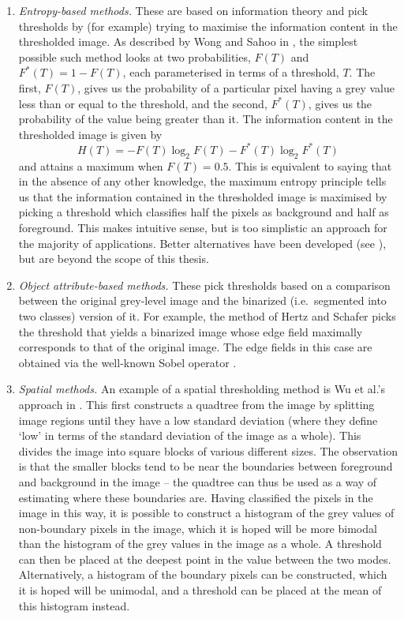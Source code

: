 \begin{enumerate}
\item \emph{Entropy-based methods.} These are based on information theory and pick thresholds by (for example) trying to maximise the information content in the thresholded image. As described by Wong and Sahoo in \cite{wong89}, the simplest possible such method looks at two probabilities, $F(T)$ and $F^*(T) = 1 - F(T)$, each parameterised in terms of a threshold, $T$. The first, $F(T)$, gives us the probability of a particular pixel having a grey value less than or equal to the threshold, and the second, $F^*(T)$, gives us the probability of the value being greater than it. The information content in the thresholded image is given by
%
\[
H(T) = -F(T) \log_2 F(T) - F^*(T) \log_2 F^*(T)
\]
%
and attains a maximum when $F(T) = 0.5$. This is equivalent to saying that in the absence of any other knowledge, the maximum entropy principle tells us that the information contained in the thresholded image is maximised by picking a threshold which classifies half the pixels as background and half as foreground. This makes intuitive sense, but is too simplistic an approach for the majority of applications. Better alternatives have been developed (see \cite{sezgin04}), but are beyond the scope of this thesis.

\item \emph{Object attribute-based methods.} These pick thresholds based on a comparison between the original grey-level image and the binarized (i.e.~segmented into two classes) version of it. For example, the method of Hertz and Schafer \cite{hertz88} picks the threshold that yields a binarized image whose edge field maximally corresponds to that of the original image. The edge fields in this case are obtained via the well-known Sobel operator \cite{gonzalez02}.

\item \emph{Spatial methods.} An example of a spatial thresholding method is Wu et al.'s approach in \cite{wu82}. This first constructs a quadtree from the image by splitting image regions until they have a low standard deviation (where they define `low' in terms of the standard deviation of the image as a whole). This divides the image into square blocks of various different sizes. The observation is that the smaller blocks tend to be near the boundaries between foreground and background in the image -- the quadtree can thus be used as a way of estimating where these boundaries are. Having classified the pixels in the image in this way, it is possible to construct a histogram of the grey values of non-boundary pixels in the image, which it is hoped will be more bimodal than the histogram of the grey values in the image as a whole. A threshold can then be placed at the deepest point in the value between the two modes. Alternatively, a histogram of the boundary pixels can be constructed, which it is hoped will be unimodal, and a threshold can be placed at the mean of this histogram instead.


\end{enumerate}
